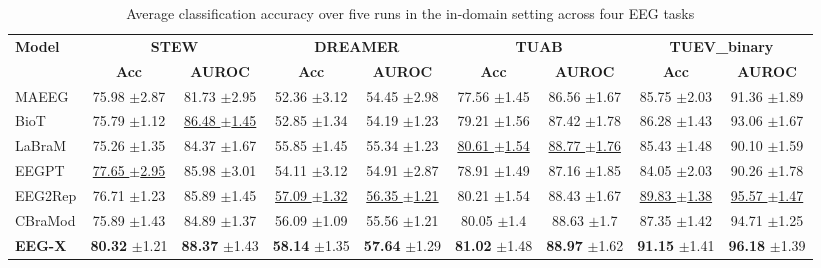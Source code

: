 \documentclass{article} %
\begin{document}
\begin{table}[ht]
    \centering
    \caption{Average classification accuracy over five runs in the in-domain setting across four EEG tasks}
    {\footnotesize  %
    \setlength{\tabcolsep}{3pt} %
    \begin{tabular}{l|cc|cc|cc|cc}
        \toprule
        \multirow{2}{*}{\textbf{Model}} & \multicolumn{2}{c|}{\textbf{STEW}} & \multicolumn{2}{c|}{\textbf{DREAMER}} & \multicolumn{2}{c|}{\textbf{TUAB}} & \multicolumn{2}{c}{\textbf{TUEV\_binary}} \\
        \cmidrule(lr){2-3} \cmidrule(lr){4-5} \cmidrule(lr){6-7} \cmidrule(lr){8-9}
        & \textbf{Acc} & \textbf{AUROC} & \textbf{Acc} & \textbf{AUROC} & \textbf{Acc} & \textbf{AUROC} & \textbf{Acc} & \textbf{AUROC} \\
        \midrule
        MAEEG   & 75.98 $\pm$\tiny{2.87} & 81.73 $\pm$\tiny{2.95} & 52.36 $\pm$\tiny{3.12} & 54.45 $\pm$\tiny{2.98} & 77.56 $\pm$\tiny{1.45} & 86.56 $\pm$\tiny{1.67} & 85.75 $\pm$\tiny{2.03} & 91.36 $\pm$\tiny{1.89} \\
        BioT    & 75.79 $\pm$\tiny{1.12} & \underline{86.48 $\pm$\tiny{1.45}} & 52.85 $\pm$\tiny{1.34} & 54.19 $\pm$\tiny{1.23} & 79.21 $\pm$\tiny{1.56} & 87.42 $\pm$\tiny{1.78} & 86.28 $\pm$\tiny{1.43} & 93.06 $\pm$\tiny{1.67} \\
        LaBraM  & 75.26 $\pm$\tiny{1.35} & 84.37 $\pm$\tiny{1.67} & 55.85 $\pm$\tiny{1.45} & 55.34 $\pm$\tiny{1.23} & \underline{80.61 $\pm$\tiny{1.54}} & \underline{88.77 $\pm$\tiny{1.76}} & 85.43 $\pm$\tiny{1.48} & 90.10 $\pm$\tiny{1.59} \\
        EEGPT   & \underline{77.65 $\pm$\tiny{2.95}} & 85.98 $\pm$\tiny{3.01} & 54.11 $\pm$\tiny{3.12} & 54.91 $\pm$\tiny{2.87} & 78.91 $\pm$\tiny{1.49} & 87.16 $\pm$\tiny{1.85} & 84.05 $\pm$\tiny{2.03} & 90.26 $\pm$\tiny{1.78} \\
        EEG2Rep & 76.71 $\pm$\tiny{1.23} & 85.89 $\pm$\tiny{1.45} & \underline{57.09 $\pm$\tiny{1.32}} & \underline{56.35 $\pm$\tiny{1.21}} & 80.21 $\pm$\tiny{1.54} & 88.43 $\pm$\tiny{1.67} & \underline{89.83 $\pm$\tiny{1.38}} & \underline{95.57 $\pm$\tiny{1.47}} \\ 
        CBraMod & 75.89 $\pm$\tiny{1.43} & 84.89 $\pm$\tiny{1.37} & 56.09 $\pm$\tiny{1.09} & 55.56 $\pm$\tiny{1.21} & 80.05 $\pm$\tiny{1.4} & 88.63 $\pm$\tiny{1.7} & 87.35 $\pm$\tiny{1.42} & 94.71 $\pm$\tiny{1.25} \\
        \midrule
        \rowcolor{blue!10} \textbf{EEG-X}   & \textbf{80.32} $\pm$\tiny{1.21} & \textbf{88.37} $\pm$\tiny{1.43} & \textbf{58.14} $\pm$\tiny{1.35} & \textbf{57.64} $\pm$\tiny{1.29} & \textbf{81.02} $\pm$\tiny{1.48} & \textbf{88.97} $\pm$\tiny{1.62} & \textbf{91.15} $\pm$\tiny{1.41} & \textbf{96.18} $\pm$\tiny{1.39}  \\
        \bottomrule
    \end{tabular}
    }
    \label{tab:indomain}
\end{table}
\end{document}
